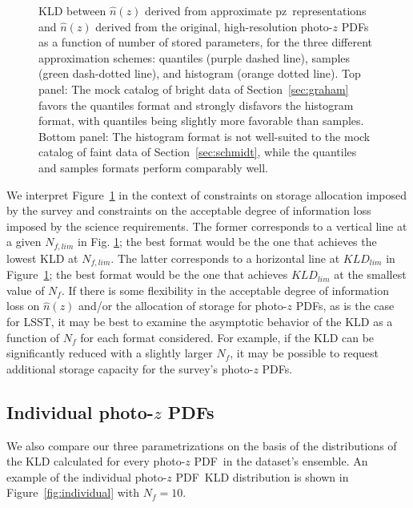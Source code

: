 \documentclass[\docopts]{\docclass}
\newcommand{\pz}{photo-$z$ PDF}
\newcommand{\mgdata}{bright\xspace}
\newcommand{\ssdata}{faint\xspace}
\begin{document}
\begin{figure}
\begin{center}
    \caption{KLD between $\hat{n}(z)$ derived from approximate pz\ 
representations and  $\hat{n}(z)$ derived from the original, high-resolution 
\pz s as a function of number of stored parameters, for the three different 
approximation schemes: quantiles (purple dashed line), samples (green 
dash-dotted line), and histogram (orange dotted line).
    Top panel: The mock catalog of \mgdata data of Section~\ref{sec:graham} 
favors the quantiles format and strongly disfavors the histogram format, with 
quantiles being slightly more favorable than samples.
    Bottom panel: The histogram format is not well-suited to the mock catalog 
of \ssdata data of Section~\ref{sec:schmidt}, while the quantiles and samples 
formats perform comparably well.
    \label{fig:kld}}
  \end{center}
\end{figure}

We interpret Figure~\ref{fig:kld} in the context of constraints on storage 
allocation imposed by the survey and constraints on the acceptable degree of 
information loss imposed by the science requirements.
The former corresponds to a vertical line at a given $N_{f, lim}$ in Fig. 
\ref{fig:kld}; the best format would be the one that achieves the lowest KLD at 
$N_{f, lim}$.
The latter corresponds to a horizontal line at $KLD_{lim}$ in 
Figure~\ref{fig:kld}; the best format would be the one that achieves 
$KLD_{lim}$ at the smallest value of $N_{f}$.
If there is some flexibility in the acceptable degree of information loss on 
$\hat{n}(z)$ and/or the allocation of storage for \pz s, as is the case for 
LSST, it may be best to examine the asymptotic behavior of the KLD as a 
function of $N_{f}$ for each format considered.
For example, if the KLD can be significantly reduced with a slightly larger 
$N_{f}$, it may be possible to request additional storage capacity for the 
survey's \pz s.


\subsection{Individual \pz s}
\label{sec:individual_results}

We also compare our three parametrizations on the basis of the distributions of 
the KLD calculated for every \pz\ in the dataset's ensemble.
An example of the individual \pz\ KLD distribution is shown in 
Figure~\ref{fig:individual} with $N_{f}=10$.
\end{document}
